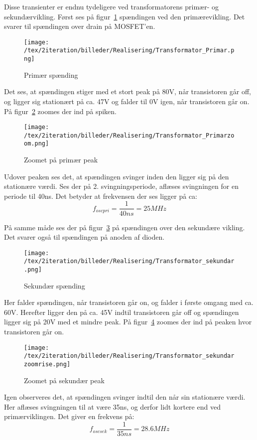 Disse transienter er endnu tydeligere ved transformatorens primær- og sekundærvikling. Først ses på figur~\ref{fig: privolt} spændingen ved den primærevikling. Det svarer til spændingen over drain på MOSFET'en. 
\begin{figure}[H]
	\center
	\texttt{[image: /tex/2iteration/billeder/Realisering/Transformator\_Primar.png]}
	\caption{Primær spænding}
	\label{fig: privolt}
\end{figure}
Det ses, at spændingen stiger med et stort peak på 80V, når transistoren går off, og ligger sig stationært på ca. 47V og falder til 0V igen, når transistoren går on. På figur~\ref{fig: prizoom} zoomes der ind på spiken.
\begin{figure}[H]
	\center
	\texttt{[image: /tex/2iteration/billeder/Realisering/Transformator\_Primarzoom.png]}
	\caption{Zoomet på primær peak}
	\label{fig: prizoom}
\end{figure}
Udover peaken ses det, at spændingen svinger inden den ligger sig på den stationære værdi. Ses der på 2. svingningsperiode, aflæses svingningen for en periode til 40ns. Det betyder at frekvensen der ses ligger på ca:
\begin{equation} \label{svingpri}
f_{oscpri} = \frac{1}{40ns} = 25MHz
\end{equation}

På samme måde ses der på figur~\ref{fig:sek} på spændingen over den sekundære vikling. Det svarer også til spændingen på anoden af dioden. 
\begin{figure}[H]
	\center
	\texttt{[image: /tex/2iteration/billeder/Realisering/Transformator\_sekundar.png]}
	\caption{Sekundær spænding}
	\label{fig:sek}
\end{figure}
Her falder spændingen, når transistoren går on, og falder i første omgang med ca. 60V. Herefter ligger den på ca. 45V indtil transistoren går off og spændingen ligger sig på 20V med et mindre peak. På figur~\ref{fig:sekzoom} zoomes der ind på peaken hvor transistoren går on.
\begin{figure}[H]
	\center
	\texttt{[image: /tex/2iteration/billeder/Realisering/Transformator\_sekundarzoomrise.png]}
	\caption{Zoomet på sekundær peak}
	\label{fig:sekzoom}
\end{figure}
Igen observeres det, at spændingen svinger indtil den når sin stationære værdi. Her aflæses svingningen til at være 35ns, og derfor lidt kortere end ved primærviklingen. Det giver en frekvens på:
\begin{equation} \label{svingsek}
f_{oscsek} = \frac{1}{35ns} = 28.6MHz
\end{equation}


